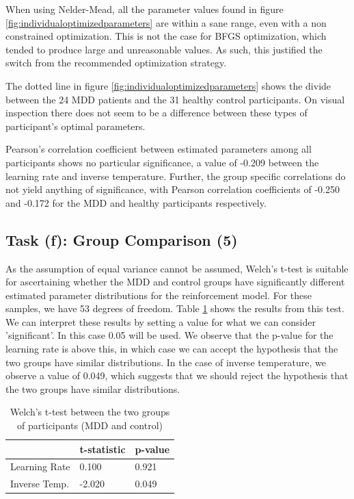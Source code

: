 \documentclass{article}
\begin{document}
When using Nelder-Mead, all the parameter values found in figure \ref{fig:individualoptimizedparameters} are within a sane range, even with a non constrained optimization. This is not the case for BFGS optimization, which tended to produce large and unreasonable values. As such, this justified the switch from the recommended optimization strategy.

The dotted line in figure \ref{fig:individualoptimizedparameters} shows the divide between the 24 MDD patients and the 31 healthy control participants. On visual inspection there does not seem to be a difference between these types of participant's optimal parameters.

Pearson's correlation coefficient between estimated parameters among all participants shows no particular significance, a value of -0.209 between the learning rate and inverse temperature. Further, the group specific correlations do not yield anything of significance, with Pearson correlation coefficients of -0.250 and -0.172 for the MDD and healthy participants respectively.


\subsection{Task (f): Group Comparison (5)}

As the assumption of equal variance cannot be assumed, Welch's t-test is suitable for ascertaining whether the MDD and control groups have significantly different estimated parameter distributions for the reinforcement model. For these samples, we have 53 degrees of freedom. Table \ref{table:ttest} shows the results from this test. We can interpret these results by setting a value for what we can consider 'significant'. In this case 0.05 will be used. We observe that the p-value for the learning rate is above this, in which case we can accept the hypothesis that the two groups have similar distributions. In the case of inverse temperature, we observe a value of 0.049, which suggests that we should reject the hypothesis that the two groups have similar distributions. 


\begin{table}[H]
  \centering
  \begin{tabular}{@{}lll@{}}
    \toprule
                & t-statistic & p-value \\ \midrule
  Learning Rate & 0.100       & 0.921   \\
  Inverse Temp. & -2.020      & 0.049   \\ \bottomrule
  \end{tabular}
  \caption{Welch's t-test between the two groups of participants (MDD and control)}
  \label{table:ttest}
\end{table}
\end{document}
